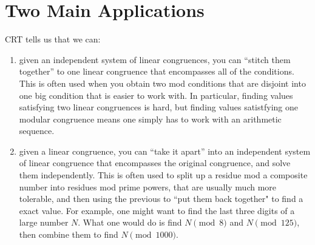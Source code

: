 \documentclass[mast]{lucky}
\begin{document}
\section{Two Main Applications}
CRT tells us that we can:
\begin{enumerate}
\item given an independent system of linear congruences, you can ``stitch them together'' to one linear congruence that encompasses all of the conditions. This is often used when you obtain two mod conditions that are disjoint into one big condition that is easier to work with. In particular, finding values satisfying two linear congruences is hard, but finding values satistfying one modular congruence means one simply has to work with an arithmetic sequence.
\item given a linear congruence, you can ``take it apart'' into an independent system of linear congruence that encompasses the original congruence, and solve them independently. This is often used to split up a residue mod a composite number into residues mod prime powers, that are usually much more tolerable, and then using the previous to ``put them back together" to find a exact value. For example, one might want to find the last three digits of a large number $N$. What one would do is find $N \pmod{8}$ and $N \pmod{125}$, then combine them to find $N\pmod{1000}$.
\end{enumerate}
\end{document}
